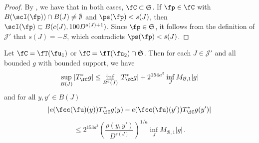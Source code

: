     \begin{proof}
        \leanok
        By , we have that in both cases, $\fC \subset \mathfrak{S}$. If $\fp \in \fC$ with $B(\scI(\fp)) \cap B(J) \neq \emptyset$ and $\ps(\fp) < s(J)$, then $\scI(\fp) \subset B(c(J), 100 D^{s(J) + 1})$. Since $\fp \in \mathfrak{S}$, it follows from the definition of $\mathcal{J}'$ that $s(J) = -S$, which contradicts $\ps(\fp) < s(J)$.
    \end{proof}

    \begin{lemma}
        \label{global-tree-control-1}
        \leanok
        Let $\fC = \fT(\fu_1)$ or $\fC = \fT(\fu_2) \cap \mathfrak{S}$. Then for each $J \in \mathcal{J}'$ and all bounded $g$ with bounded support, we have
        \begin{align}
            \label{TreeUB}
            \sup_{B(J)} |T_{\fC}^*g| \leq \inf_{B^\circ{}(J)} |T^*_{\fC} g| + 2^{154a^3} \inf_{J} M_{\mathcal{B}, 1} |g|
        \end{align}
        and for all $y,y' \in B(J)$
        $$
            |e(\fcc(\fu)(y)) T_{\fC}^* g(y) - e(\fcc(\fu)(y')) T_{\fC}^* g(y')|
        $$
        \begin{equation}
            \label{TreeHolder}
             \le 2^{153a^3} \left(\frac{\rho(y,y')}{D^{s(J)}}\right)^{1/a} \inf_J M_{\mathcal{B},1} |g|\,.
        \end{equation}
    \end{lemma}

